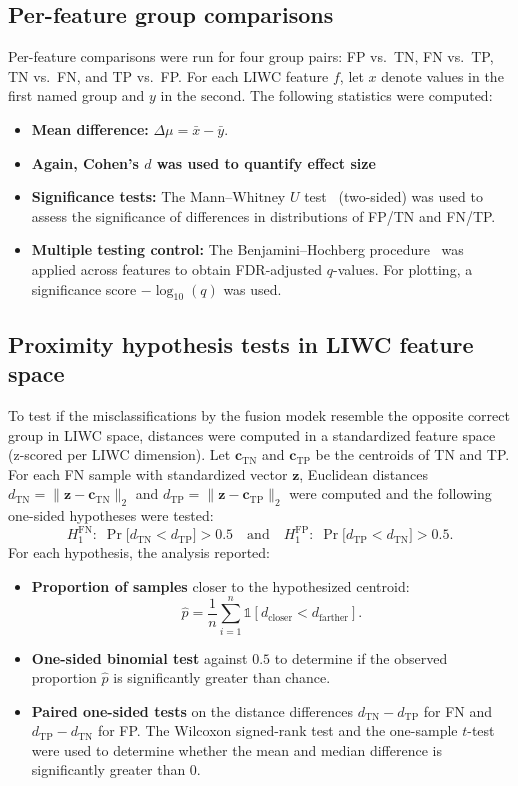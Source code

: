 \subsection{Per-feature group comparisons}
Per-feature comparisons were run for four group pairs: FP vs.\ TN, FN vs.\ TP, TN vs.\ FN, and TP vs.\ FP. For each LIWC feature \(f\), let \(x\) denote values in the first named group and \(y\) in the second. The following statistics were computed:

\begin{itemize}
\item \textbf{Mean difference:} \(\Delta\mu = \bar{x} - \bar{y}\).
\item \textbf{Again, Cohen's \(d\)  was used to quantify effect size}
\item \textbf{Significance tests:} The Mann–Whitney \(U\) test~\cite{mannwhithneyu1947} (two-sided) was used to assess the significance of differences in distributions of FP/TN and FN/TP.
\item \textbf{Multiple testing control:} The Benjamini–Hochberg procedure~\cite{benjaminhochberg} was applied across features to obtain FDR-adjusted \(q\)-values. For plotting, a significance score \(-\log_{10}(q)\) was used.
\end{itemize}

\subsection{Proximity hypothesis tests in LIWC feature space}
To test if the misclassifications by the fusion modek resemble the opposite correct group in LIWC space, distances were computed in a standardized feature space (z-scored per LIWC dimension). Let \(\mathbf{c}_{\mathrm{TN}}\) and \(\mathbf{c}_{\mathrm{TP}}\) be the centroids of TN and TP. For each FN sample with standardized vector \(\mathbf{z}\), Euclidean distances
\(d_{\mathrm{TN}} = \|\mathbf{z}-\mathbf{c}_{\mathrm{TN}}\|_2\) and
\(d_{\mathrm{TP}} = \|\mathbf{z}-\mathbf{c}_{\mathrm{TP}}\|_2\) were computed and the following one-sided hypotheses were tested:
\[
H_{1}^{\mathrm{FN}}:\; \Pr\!\big[d_{\mathrm{TN}} < d_{\mathrm{TP}}\big] > 0.5
\quad\text{and}\quad
H_{1}^{\mathrm{FP}}:\; \Pr\!\big[d_{\mathrm{TP}} < d_{\mathrm{TN}}\big] > 0.5.
\]
For each hypothesis, the analysis reported:

\begin{itemize}
  \item \textbf{Proportion of samples} closer to the hypothesized centroid:
  \[\hat{p} = \frac{1}{n} \sum_{i=1}^{n} \mathds{1}[d_{\text{closer}} < d_{\text{farther}}].\]
  \item \textbf{One-sided binomial test} against \(0.5\) to determine if the observed proportion \(\hat{p}\) is significantly greater than chance.
  \item \textbf{Paired one-sided tests} on the distance differences \(d_{\mathrm{TN}} - d_{\mathrm{TP}}\) for FN and \(d_{\mathrm{TP}} - d_{\mathrm{TN}}\) for FP. The Wilcoxon signed-rank test and the one-sample \(t\)-test were used to determine whether the mean and median difference is significantly greater than 0.
\end{itemize}

